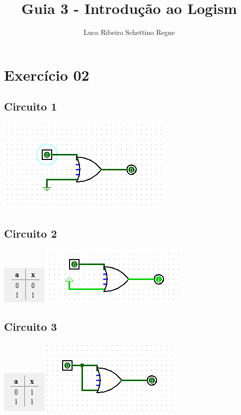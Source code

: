 \documentclass[12pt]{article}
\title{Guia 3 - Introdução ao Logism}
\author{Luca Ribeiro Schettino Regne}
\begin{document}
 

\maketitle

\section{Exercício 02}
\subsection{Circuito 1}
    \includegraphics{./images/circuito01.png}
\subsection{Circuito 2}
    \includegraphics{./images/circuito01_table.png}
\includegraphics{./images/circuito02.png}
\subsection{Circuito 3}
    \includegraphics{./images/circuito02_table.png}
\includegraphics{./images/circuito03.png}
\end{document}
